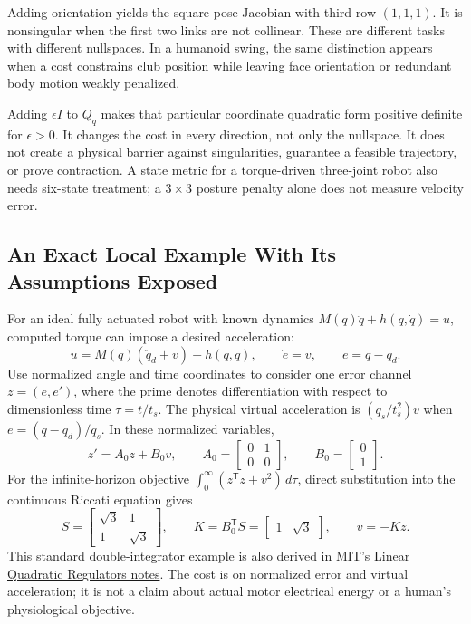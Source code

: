 Adding orientation yields the square pose Jacobian with third row $(1,1,1)$. It is nonsingular when the first two links are not collinear. These are different tasks with different nullspaces. In a humanoid swing, the same distinction appears when a cost constrains club position while leaving face orientation or redundant body motion weakly penalized.

Adding $\epsilon I$ to $Q_q$ makes that particular coordinate quadratic form positive definite for $\epsilon>0$. It changes the cost in every direction, not only the nullspace. It does not create a physical barrier against singularities, guarantee a feasible trajectory, or prove contraction. A state metric for a torque-driven three-joint robot also needs six-state treatment; a $3\times3$ posture penalty alone does not measure velocity error.

\subsection{An Exact Local Example With Its Assumptions Exposed}

For an ideal fully actuated robot with known dynamics $M(q)\ddot q+h(q,\dot q)=u$, computed torque can impose a desired acceleration:
\begin{equation}
 u=M(q)(\ddot q_d+v)+h(q,\dot q),\qquad \ddot e=v,\qquad e=q-q_d.
\end{equation}
Use normalized angle and time coordinates to consider one error channel $z=(e,e')$, where the prime denotes differentiation with respect to dimensionless time $\tau=t/t_s$. The physical virtual acceleration is $(q_s/t_s^2)v$ when $e=(q-q_d)/q_s$. In these normalized variables,
\begin{equation}
 z'=A_0z+B_0v,\qquad A_0=\begin{bmatrix}0&1\\0&0\end{bmatrix},\qquad B_0=\begin{bmatrix}0\\1\end{bmatrix}.
\end{equation}
For the infinite-horizon objective $\int_0^\infty(z^{\mathsf T}z+v^2)\,d\tau$, direct substitution into the continuous Riccati equation gives
\begin{equation}
 S=\begin{bmatrix}\sqrt3&1\\1&\sqrt3\end{bmatrix},\qquad
 K=B_0^{\mathsf T}S=\begin{bmatrix}1&\sqrt3\end{bmatrix},\qquad v=-Kz.
\end{equation}
This standard double-integrator example is also derived in \href{https://underactuated.mit.edu/lqr.html}{MIT's Linear Quadratic Regulators notes}. The cost is on normalized error and virtual acceleration; it is not a claim about actual motor electrical energy or a human's physiological objective.

